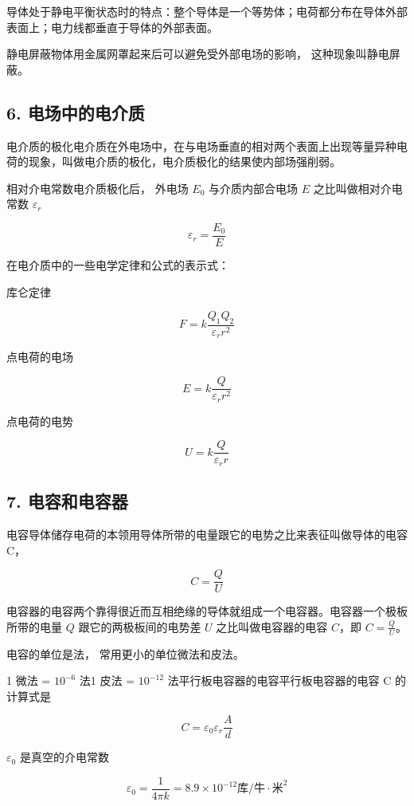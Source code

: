 导体处于静电平衡状态时的特点：整个导体是一个等势体；电荷都分布在导体外部表面上；电力线都垂直于导体的外部表面。

静电屏蔽物体用金属网罩起来后可以避免受外部电场的影响，
这种现象叫静电屏蔽。

\subsection{6.
电场中的电介质}\label{ux7535ux573aux4e2dux7684ux7535ux4ecbux8d28-1}

电介质的极化电介质在外电场中，在与电场垂直的相对两个表面上出现等量异种电荷的现象，叫做电介质的极化，电介质极化的结果使内部场强削弱。

相对介电常数电介质极化后， 外电场 \(E_0\) 与介质内部合电场 \(E\)
之比叫做相对介电常数 \(\varepsilon_r\)

\[
\varepsilon_{r}=\frac{E_{0}}{E}
\]

在电介质中的一些电学定律和公式的表示式：

库仑定律

\[
F=k\frac{Q_{1}Q_{2}}{\varepsilon_{r} r^{2}}
\]

点电荷的电场

\[
E = k \frac{Q}{\varepsilon_{r} r^{2}}
\]

点电荷的电势

\[
U = k \frac{Q}{\varepsilon_{r} r}
\]

\subsection{7. 电容和电容器}\label{ux7535ux5bb9ux548cux7535ux5bb9ux5668}

电容导体储存电荷的本领用导体所带的电量跟它的电势之比来表征叫做导体的电容C，

\[
C = \frac{Q}{U}
\]

电容器的电容两个靠得很近而互相绝缘的导体就组成一个电容器。电容器一个极板所带的电量
\(Q\) 跟它的两极板间的电势差 \(U\) 之比叫做电容器的电容 \(C\)，即
\(C = \frac{Q}{U}\)。

电容的单位是法， 常用更小的单位微法和皮法。

1 微法 = \(10^{-6}\) 法1 皮法 = \(10^{-12}\)
法平行板电容器的电容平行板电容器的电容 C 的计算式是

\[
C = \varepsilon_{0}\varepsilon_{r} \frac{A}{d}
\]

\(\varepsilon_{0}\) 是真空的介电常数

\[
\varepsilon_{0} = \frac{1}{4 \pi k} = 8.9\times10^{-12} \text{库/牛}\mathbin{\cdot}\text{米}^{2}
\]

